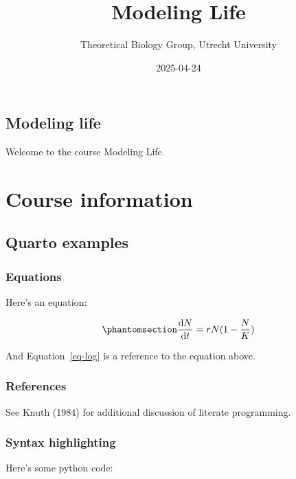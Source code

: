 \documentclass[
  letterpaper,
  DIV=11,
  numbers=noendperiod]{scrreprt}
\title{Modeling Life}
\author{Theoretical Biology Group, Utrecht University}
\date{2025-04-24}
\renewcommand*\contentsname{Table of contents}
\newcommand\contentsname{Table of contents}
\theoremstyle{definition}
\theoremstyle{remark}
\begin{document}
\maketitle

\renewcommand*\contentsname{Table of contents}
{
\hypersetup{linkcolor=}
\setcounter{tocdepth}{2}
\tableofcontents
}

\chapter*{Modeling life}\label{modeling}


Welcome to the course Modeling Life.

\part{Course information}

\chapter{Quarto examples}\label{quarto-examples}

\section{Equations}\label{equations}

Here's an equation:

\begin{equation}\phantomsection\label{eq-log}{ 
\frac{\mathrm{d}N}{\mathrm{d}t} = rN(1 - \frac{N}{K}) 
}\end{equation}

And Equation~\ref{eq-log} is a reference to the equation above.

\section{References}\label{references}

See Knuth (1984) for additional discussion of literate programming.

\section{Syntax highlighting}\label{syntax-highlighting}

Here's some python code:
\end{document}
